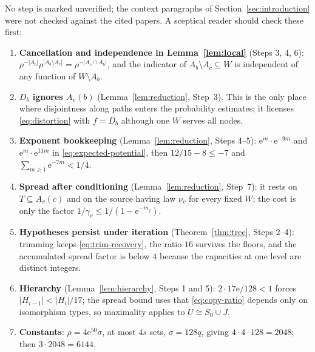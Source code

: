 \documentclass[11pt]{article}
\numberwithin{equation}{section}
\newcommand{\ee}{\mathrm e}
\begin{document}
No step is marked unverified; the context paragraphs of
Section~\ref{sec:introduction} were not checked against the cited
papers. A sceptical reader should check these first:
\begin{enumerate}[itemsep=2pt,topsep=3pt]
 \item \textbf{Cancellation and independence in Lemma~\ref{lem:local}}
 (Steps 3, 4, 6): $\rho^{-|A_b|}\rho^{|A_b\setminus A_c|}
 =\rho^{-|A_c\cap A_b|}$, and the indicator of
 $A_b\setminus A_c\subseteq W$ is independent of any function of
 $W\setminus A_b$.
 \item \textbf{$D_b$ ignores $A_v(b)$} (Lemma~\ref{lem:reduction},
 Step~3). This is the only place where disjointness along paths enters
 the probability estimates; it licenses \eqref{eq:distortion} with
 $f=D_b$ although one $W$ serves all nodes.
 \item \textbf{Exponent bookkeeping} (Lemma~\ref{lem:reduction}, Steps
 4--5): $\ee^{m}\cdot\ee^{-9m}$ and $\ee^{m}\cdot\ee^{11m}$ in
 \eqref{eq:expected-potential}, then $12/15-8\le-7$ and
 $\sum_{m\ge1}\ee^{-7m}<1/4$.
 \item \textbf{Spread after conditioning} (Lemma~\ref{lem:reduction},
 Step~7): it rests on $T\subseteq A_v(c)$ and on the source having law
 $\nu_v$ for every fixed $W$; the cost is only the factor
 $1/\gamma_v\le1/(1-\ee^{-m_j})$.
 \item \textbf{Hypotheses persist under iteration}
 (Theorem~\ref{thm:tree}, Steps 2--4): trimming keeps
 \eqref{eq:trim-recovery}, the ratio $16$ survives the floors, and the
 accumulated spread factor is below $4$ because the capacities at one
 level are distinct integers.
 \item \textbf{Hierarchy} (Lemma~\ref{lem:hierarchy}, Steps 1 and 5):
 $2\cdot17\ee/128<1$ forces $|H_{i-1}|<|H_i|/17$; the spread bound uses
 that \eqref{eq:copy-ratio} depends only on isomorphism types, so
 maximality applies to $U\cong S_0\cup J$.
 \item \textbf{Constants}: $\rho=4\ee^{50}\sigma$, at most $4s$ sets,
 $\sigma=128q$, giving $4\cdot4\cdot128=2048$; then $3\cdot2048=6144$.
\end{enumerate}
\end{document}

